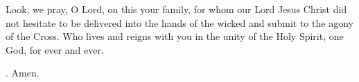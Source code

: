 \lettrine[lines=3]{L}{}ook, we pray, O Lord, on this your family,
for whom our Lord Jesus Christ
did not hesitate to be delivered into the hands of the wicked
and submit to the agony of the Cross.
Who lives and reigns with you
in the unity of the Holy Spirit,
one God, for ever and ever. \par \Rbar. Amen.